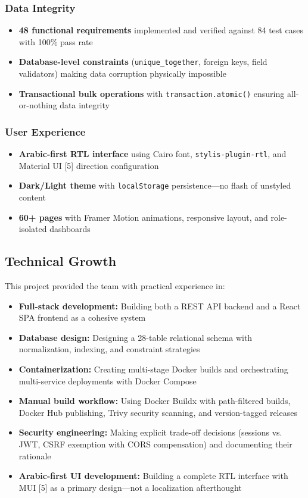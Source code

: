 \subsubsection{Data Integrity}
\begin{itemize}
    \item \textbf{48 functional requirements} implemented and verified against 84 test cases with 100\% pass rate
    \item \textbf{Database-level constraints} (\texttt{unique\_together}, foreign keys, field validators) making data corruption physically impossible
    \item \textbf{Transactional bulk operations} with \texttt{transaction.atomic()} ensuring all-or-nothing data integrity
\end{itemize}

\subsubsection{User Experience}
\begin{itemize}
    \item \textbf{Arabic-first RTL interface} using Cairo font, \texttt{stylis-plugin-rtl}, and Material UI [5] direction configuration
    \item \textbf{Dark/Light theme} with \texttt{localStorage} persistence---no flash of unstyled content
    \item \textbf{60+ pages} with Framer Motion animations, responsive layout, and role-isolated dashboards
\end{itemize}

\subsection{Technical Growth}

This project provided the team with practical experience in:

\begin{itemize}
    \item \textbf{Full-stack development:} Building both a REST API backend and a React SPA frontend as a cohesive system
    \item \textbf{Database design:} Designing a 28-table relational schema with normalization, indexing, and constraint strategies
    \item \textbf{Containerization:} Creating multi-stage Docker builds and orchestrating multi-service deployments with Docker Compose
    \item \textbf{Manual build workflow:} Using Docker Buildx with path-filtered builds, Docker Hub publishing, Trivy security scanning, and version-tagged releases
    \item \textbf{Security engineering:} Making explicit trade-off decisions (sessions vs. JWT, CSRF exemption with CORS compensation) and documenting their rationale
    \item \textbf{Arabic-first UI development:} Building a complete RTL interface with MUI [5] as a primary design---not a localization afterthought
\end{itemize}

